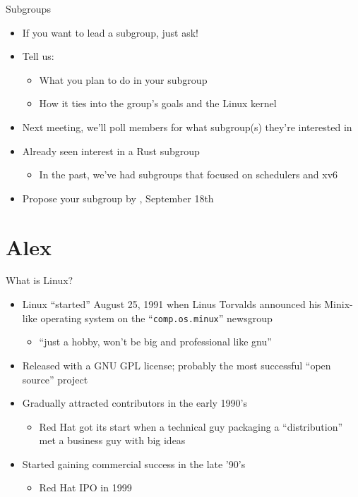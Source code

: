 \documentclass[aspectratio=169, notes]{beamer}
\begin{document}
\begin{frame}{Subgroups}
	\begin{itemize}
	\item If you want to lead a subgroup, just ask!
	\item Tell us:
		\begin{itemize}
		\item What you plan to do in your subgroup
		\item How it ties into the group's goals and the Linux kernel
		\end{itemize}
	\item Next meeting, we'll poll members for what subgroup(s) they're interested in
	\item Already seen interest in a Rust subgroup
		\begin{itemize}
		\item In the past, we've had subgroups that focused on schedulers and xv6
		\end{itemize}
	\item Propose your subgroup by , September 18th
	\end{itemize}
\end{frame}

\section{Alex}

\begin{frame}{What is Linux?}
	\pause
	\begin{itemize}
	\item Linux ``started'' August 25, 1991 when Linus Torvalds announced his Minix-like operating system on the ``\texttt{comp.os.minux}'' newsgroup
		\begin{itemize}
		\item ``just a hobby, won't be big and professional like gnu''
		\end{itemize}
	\item Released with a GNU GPL license; probably the most successful ``open source'' project
	\item Gradually attracted contributors in the early 1990's
		\begin{itemize}
		\item Red Hat got its start when a technical guy packaging a ``distribution'' met a business guy with big ideas
		\end{itemize}
	\item Started gaining commercial success in the late '90's
		\begin{itemize}
		\item Red Hat IPO in 1999
		\end{itemize}
	\end{itemize}
\end{frame}
\end{document}
